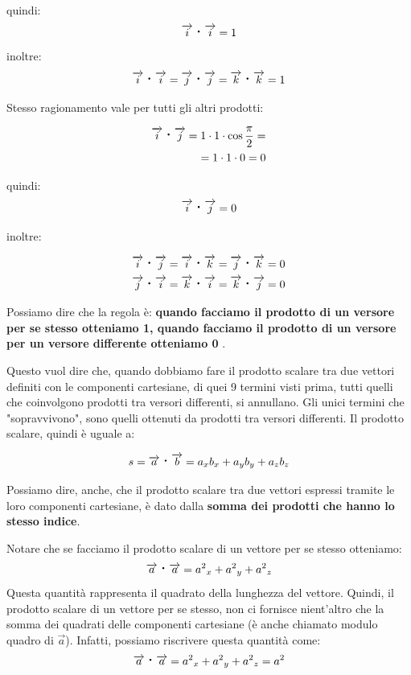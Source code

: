 \documentclass[a4paper]{book}
\newcommand{\prodscal}{\text{\large{\textbf{\textperiodcentered}}}} %
\begin{document}
quindi:
$$ \overrightarrow{i} \prodscal \overrightarrow{i} = 1$$
inoltre:
$$ \overrightarrow{i} \prodscal \overrightarrow{i} = \overrightarrow{j} \prodscal \overrightarrow{j} = \overrightarrow{k} \prodscal \overrightarrow{k} = 1 $$

Stesso ragionamento vale per tutti gli altri prodotti:

\begin{align*}
\overrightarrow{i} \prodscal \overrightarrow{j} = 1 	\cdot 1 \cdot \cos \frac{\pi}{2} = \\
 = 1 \cdot 1 \cdot 0 = 0
\end{align*}

quindi:
$$ \overrightarrow{i} \prodscal \overrightarrow{j} = 0 $$

inoltre:

\begin{align*}
\overrightarrow{i} \prodscal \overrightarrow{j} = \overrightarrow{i} \prodscal \overrightarrow{k} = \overrightarrow{j} \prodscal \overrightarrow{k} = 0 \\
\overrightarrow{j} \prodscal \overrightarrow{i} = \overrightarrow{k} \prodscal \overrightarrow{i} = \overrightarrow{k} \prodscal \overrightarrow{j} = 0
\end{align*}

Possiamo dire che la regola è: \textbf{quando facciamo il prodotto di un versore per se stesso otteniamo 1, quando facciamo il prodotto di un versore per un versore differente otteniamo 0} .

Questo vuol dire che, quando dobbiamo fare il prodotto scalare tra due vettori definiti con le componenti cartesiane,  di quei 9 termini visti prima, tutti quelli che coinvolgono prodotti tra versori differenti, si annullano. Gli unici termini che "sopravvivono", sono quelli ottenuti da prodotti tra versori differenti. Il prodotto scalare, quindi è uguale a:

$$ s =\overrightarrow{a} \prodscal \overrightarrow{b} = a_{x} b_{x} + a_{y} b_{y} + a_{z} b_{z} $$

Possiamo dire, anche, che il prodotto scalare tra due vettori espressi tramite le loro componenti cartesiane, è dato dalla \textbf{somma dei prodotti che hanno lo stesso indice}.

Notare che se facciamo il prodotto scalare di un vettore per se stesso otteniamo:
$$ \overrightarrow{a} \prodscal \overrightarrow{a} = {a^{2}}_{x} + {a^{2}}_{y} + {a^{2}}_{z} $$
Questa quantità rappresenta il quadrato della lunghezza del vettore. Quindi, il prodotto scalare di un vettore per se stesso, non ci fornisce nient'altro che la somma dei quadrati delle componenti cartesiane (è anche chiamato modulo quadro di $\overrightarrow{a} $). Infatti, possiamo riscrivere questa quantità come:
$$ \overrightarrow{a} \prodscal \overrightarrow{a} = {a^{2}}_{x} + {a^{2}}_{y} + {a^{2}}_{z} = a^{2} $$
\end{document}
